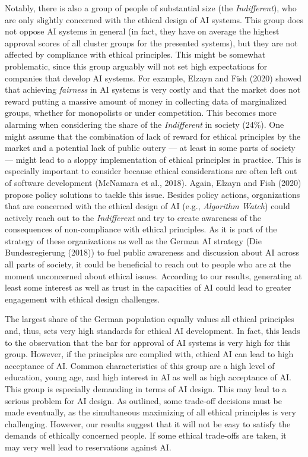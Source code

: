\documentclass{article}
\begin{document}
Notably, there is also a group of people of substantial size (the
\emph{Indifferent}), who are only slightly concerned with the ethical
design of AI systems. This group does not oppose AI systems in general
(in fact, they have on average the highest approval scores of all
cluster groups for the presented systems), but they are not affected by
compliance with ethical principles. This might be somewhat problematic,
since this group arguably will not set high expectations for companies
that develop AI systems. For example, Elzayn and Fish (2020) showed that
achieving \emph{fairness} in AI systems is very costly and that the
market does not reward putting a massive amount of money in collecting
data of marginalized groups, whether for monopolists or under
competition. This becomes more alarming when considering the share of
the \emph{Indifferent} in society (24\%). One might assume that the
combination of lack of reward for ethical principles by the market and a
potential lack of public outcry --- at least in some parts of society
--- might lead to a sloppy implementation of ethical principles in
practice. This is especially important to consider because ethical
considerations are often left out of software development (McNamara et
al., 2018). Again, Elzayn and Fish (2020) propose policy solutions to
tackle this issue. Besides policy actions, organizations that are
concerned with the ethical design of AI (e.g., \emph{Algorithm Watch})
could actively reach out to the \emph{Indifferent} and try to create
awareness of the consequences of non-compliance with ethical principles.
As it is part of the strategy of these organizations as well as the
German AI strategy (Die Bundesregierung (2018)) to fuel public awareness
and discussion about AI across all parts of society, it could be
beneficial to reach out to people who are at the moment unconcerned
about ethical issues. According to our results, generating at least some
interest as well as trust in the capacities of AI could lead to greater
engagement with ethical design challenges.

The largest share of the German population equally values all ethical
principles and, thus, sets very high standards for ethical AI
development. In fact, this leads to the observation that the bar for
approval of AI systems is very high for this group. However, if the
principles are complied with, ethical AI can lead to high acceptance of
AI. Common characteristics of this group are a high level of education,
young age, and high interest in AI as well as high acceptance of AI.
This group is especially demanding in terms of AI design. This may lead
to a serious problem for AI design. As outlined, some trade-off
decisions must be made eventually, as the simultaneous maximizing of all
ethical principles is very challenging. However, our results suggest
that it will not be easy to satisfy the demands of ethically concerned
people. If some ethical trade-offs are taken, it may very well lead to
reservations against AI.
\end{document}
